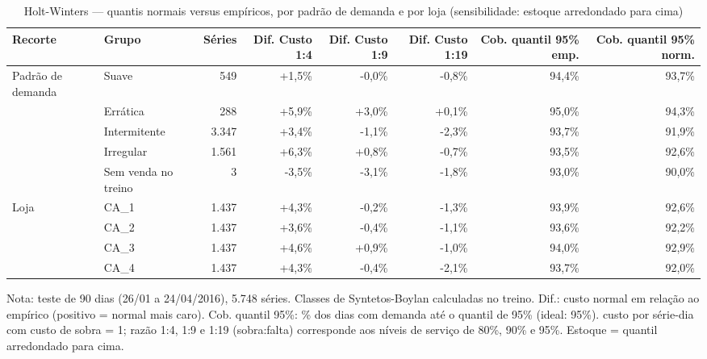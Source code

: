 \begin{table}[htbp]
\centering
\small
\caption{Holt-Winters — quantis normais versus empíricos, por padrão de demanda e por loja (sensibilidade: estoque arredondado para cima)}
\label{tab:hw_empirico_vs_normal_por_grupo_sensibilidade}
\begin{tabular}{llrrrrrr}
\toprule
Recorte & Grupo & Séries & Dif. Custo 1:4 & Dif. Custo 1:9 & Dif. Custo 1:19 & Cob. quantil 95\% emp. & Cob. quantil 95\% norm. \\
\midrule
Padrão de demanda & Suave & 549 & +1,5\% & -0,0\% & -0,8\% & 94,4\% & 93,7\% \\
 & Errática & 288 & +5,9\% & +3,0\% & +0,1\% & 95,0\% & 94,3\% \\
 & Intermitente & 3.347 & +3,4\% & -1,1\% & -2,3\% & 93,7\% & 91,9\% \\
 & Irregular & 1.561 & +6,3\% & +0,8\% & -0,7\% & 93,5\% & 92,6\% \\
 & Sem venda no treino & 3 & -3,5\% & -3,1\% & -1,8\% & 93,0\% & 90,0\% \\
\addlinespace
Loja & CA\_1 & 1.437 & +4,3\% & -0,2\% & -1,3\% & 93,9\% & 92,6\% \\
 & CA\_2 & 1.437 & +3,6\% & -0,4\% & -1,1\% & 93,6\% & 92,2\% \\
 & CA\_3 & 1.437 & +4,6\% & +0,9\% & -1,0\% & 94,0\% & 92,9\% \\
 & CA\_4 & 1.437 & +4,3\% & -0,4\% & -2,1\% & 93,7\% & 92,0\% \\
\bottomrule
\end{tabular}
\par\smallskip
{\footnotesize Nota: teste de 90 dias (26/01 a 24/04/2016), 5.748 séries. Classes de Syntetos-Boylan calculadas no treino. Dif.: custo normal em relação ao empírico (positivo = normal mais caro). Cob. quantil 95\%: \% dos dias com demanda até o quantil de 95\% (ideal: 95\%). custo por série-dia com custo de sobra = 1; razão 1:4, 1:9 e 1:19 (sobra:falta) corresponde aos níveis de serviço de 80\%, 90\% e 95\%. Estoque = quantil arredondado para cima.}
\end{table}
